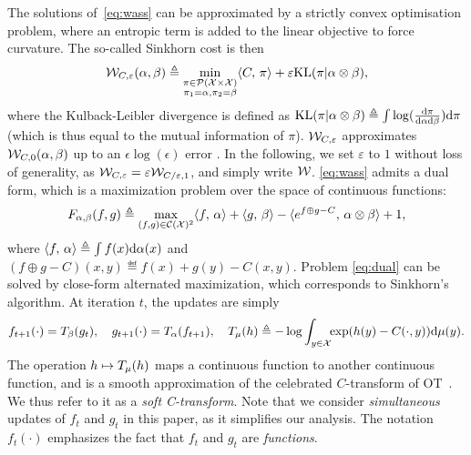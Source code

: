 The solutions of~\eqref{eq:wass} can be approximated by a strictly convex optimisation problem, where an entropic term is added to the linear objective to force curvature. The so-called Sinkhorn cost is then
\begin{equation}\label{eq:wass}
    \mathcal{W}_{C,\varepsilon}(\alpha, \beta) \triangleq 
    \min_{
    \substack{
        \pi \in \mathcal{P}(\mathcal{X} \times \mathcal{X})
        \\\pi_1 = \alpha, \pi_2 = \beta
    }    
    } \langle C,\,\pi\rangle + \varepsilon \textrm{KL}(\pi | \alpha \otimes \beta),
\end{equation}
where the Kulback-Leibler divergence is defined as $\textrm{KL}(\pi | \alpha \otimes
\beta) \triangleq \int \log(\frac{\textrm{d}\pi}{\textrm{d}\alpha\textrm{d}\beta}) \textrm{d}\pi$ (which is thus equal to
the mutual information of $\pi$).
%
$\mathcal{W}_{C,\varepsilon}$ approximates $\mathcal{W}_{C,0}(\alpha,\beta)$ up to an $\epsilon
\log(\epsilon)$ error \citep{2019-Genevay-aistats}. In the following, we set
$\varepsilon$ to $1$ without loss of generality, as $\mathcal{W}_{C, \varepsilon} =
\varepsilon \mathcal{W}_{C / \varepsilon, 1}$, and simply write $\mathcal{W}$.
%
\eqref{eq:wass} admits a dual form, which is a maximization problem over the space of continuous functions:
\begin{equation}\label{eq:dual}
    F_{\alpha, \beta}(f, g) \triangleq \max_{(f, g) \in \mathcal{C}(\mathcal{X})^2} \langle f,\,\alpha\rangle + 
    \langle g,\,\beta\rangle
    - \langle e^{f \oplus g - C},\,\alpha \otimes \beta\rangle + 1, 
\end{equation}
where $\langle f,\,\alpha\rangle \triangleq \int f(x) \textrm{d}\alpha(x)$ and $(f \oplus g - C)(x,y)
\eqdef f(x)+g(y)-C(x,y)$.
Problem \eqref{eq:dual} can be solved by close-form alternated maximization, which corresponds to Sinkhorn's algorithm. At iteration $t$, the updates are simply
\begin{equation}
    f_{t+1}(\cdot) = T_{\beta}(g_t), \quad
    g_{t+1}(\cdot) = T_{\alpha}(f_{t+1}),\quad
    T_{\mu}(h) \triangleq 
    - \log \int_{y \in \mathcal{X}}\!\! \exp(h(y) - C(\cdot, y))\textrm{d} \mu(y).\label{eq:sinkhorn}
\end{equation}
The operation $h \mapsto T_{\mu}(h)$  maps a continuous function to another
continuous function, and is a smooth approximation of the celebrated
$C$-transform of OT~\citep{santambrogio2015optimal}. We thus refer to it as a
\textit{soft C-transform}. Note that we consider \textit{simultaneous} updates
of $f_t$ and $g_t$ in this paper, as it simplifies our analysis.
%
The notation $f_t(\cdot)$ emphasizes the fact that $f_t$ and $g_t$ are
\textit{functions}. 
%

